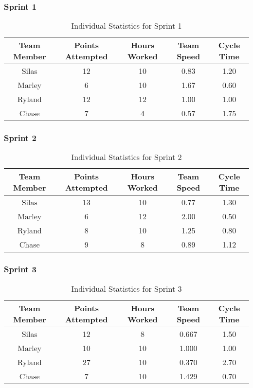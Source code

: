 \subsubsection{Sprint 1}
\begin{table}[H]
    \centering
    \begin{tabular}{|c|c|c|c|c|}
    \hline
    \textbf{Team Member} & \textbf{Points Attempted} & \textbf{Hours Worked} & \textbf{Team Speed} & \textbf{Cycle Time}  \\ \hline
    Silas & 12 & 10 & 0.83 & 1.20 \\ \hline
    Marley & 6 & 10 & 1.67 & 0.60 \\ \hline
    Ryland & 12 & 12 & 1.00 & 1.00 \\ \hline
    Chase & 7 & 4 & 0.57 & 1.75 \\ \hline
    \end{tabular}
    \caption{Individual Statistics for Sprint 1}
    \label{tab:individual_sprint1}
\end{table}

\subsubsection{Sprint 2}
\begin{table}[H]
    \centering
    \begin{tabular}{|c|c|c|c|c|}
    \hline
    \textbf{Team Member} & \textbf{Points Attempted} & \textbf{Hours Worked} & \textbf{Team Speed} & \textbf{Cycle Time}  \\ \hline
    Silas & 13 & 10 & 0.77 & 1.30 \\ \hline
    Marley & 6 & 12 & 2.00 & 0.50 \\ \hline
    Ryland & 8 & 10 & 1.25 & 0.80 \\ \hline
    Chase & 9 & 8 & 0.89 & 1.12 \\ \hline
    \end{tabular}
    \caption{Individual Statistics for Sprint 2}
    \label{tab:individual_sprint2}
\end{table}

\subsubsection{Sprint 3}
\begin{table}[H]
    \centering
    \begin{tabular}{|c|c|c|c|c|}
    \hline
    \textbf{Team Member} & \textbf{Points Attempted} & \textbf{Hours Worked} & \textbf{Team Speed} & \textbf{Cycle Time}  \\ \hline
    Silas & 12 & 8 & 0.667 & 1.50 \\ \hline
    Marley & 10 & 10 & 1.000 & 1.00 \\ \hline
    Ryland & 27 & 10 & 0.370 & 2.70 \\ \hline
    Chase & 7 & 10 & 1.429 & 0.70 \\ \hline
    \end{tabular}
    \caption{Individual Statistics for Sprint 3}
    \label{tab:individual_sprint3}
\end{table}

